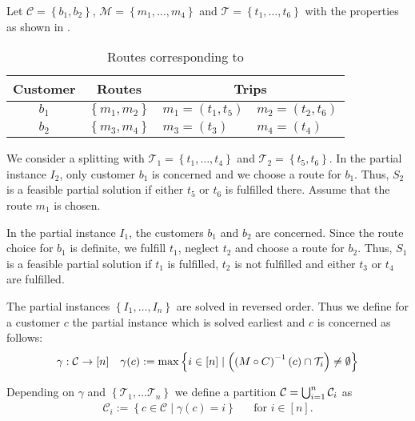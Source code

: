 \begin{example}
\label{ex:routechoice}

Let ${\mathcal{C}=\left\{b_1,b_2\right\}}$, ${\mathcal{M}=\left\{m_1,\dots,m_4\right\}}$ and ${\mathcal{T}=\left\{t_1,\dots,t_6\right\}}$ with the properties as shown in .

\begin{table}[htb]
	\centering
	\begin{tabular}{c|cll}
		\toprule
		Customer & Routes & \multicolumn{2}{c}{Trips} \\
		\midrule%
		$b_1$ & $\left\{m_1,m_2\right\}$ & $m_1=\left(t_1,t_5\right)$ & $m_2=\left(t_2,t_6\right)$ \\
		$b_2$ & $\left\{m_3,m_4\right\}$ & $m_3=\left(t_3\right)$ & $m_4=\left(t_4\right)$ \\
		\bottomrule
	\end{tabular}
	\caption{Routes corresponding to }
	\label{tab:routechoice}
\end{table}

We consider a splitting with ${\mathcal{T}_1=\left\{t_1,\dots,t_4\right\}}$ and ${\mathcal{T}_2=\left\{t_5,t_6\right\}}$. In the partial instance $I_2$, only customer $b_1$ is concerned and we choose a route for $b_1$. Thus, $S_2$ is a feasible partial solution if either $t_5$ or $t_6$ is fulfilled there. Assume that the route $m_1$ is chosen. 

In the partial instance $I_1$, the customers $b_1$ and $b_2$ are concerned. Since the route choice for $b_1$ is definite, we fulfill $t_1$, neglect $t_2$ and choose a route for $b_2$. Thus, $S_1$ is a feasible partial solution if $t_1$ is fulfilled, $t_2$ is not fulfilled and either $t_3$ or $t_4$ are fulfilled.

\end{example}

The partial instances $\left\{I_1,\dots,I_n\right\}$ are solved in reversed order. Thus we define for a customer $c$ the partial instance which is solved earliest and $c$ is concerned as follows: 
\begin{align*}
	\gamma: \mathcal{C}\to[n] && \gamma(c) := \max\left\{i\in[n]\mid\left(\left(M\circ C\right)^{-1}(c)\cap\mathcal{T}_i\right)\neq\emptyset\right\}
\end{align*}

Depending on $\gamma$ and $\left\{\mathcal{T}_1,\dots\mathcal{T}_n\right\}$ we define a partition ${\mathcal{C}=\bigcup_{i=1}^n \mathcal{C}_i}$ as
\begin{align*}
	\mathcal{C}_i := \left\{c\in\mathcal{C}\mid \gamma(c)=i\right\} && \text{for } i\in[n].
\end{align*}

